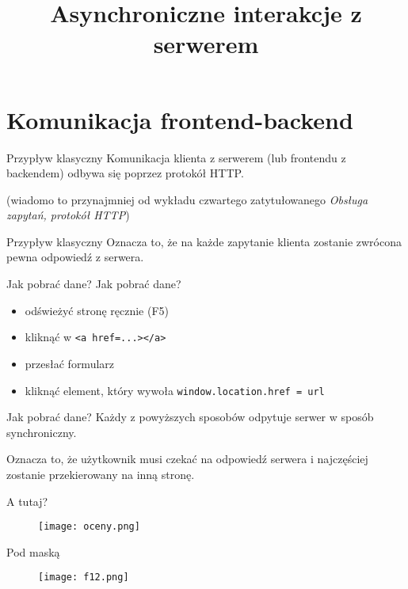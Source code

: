 

\title{Asynchroniczne interakcje z serwerem}



\section{Komunikacja frontend-backend}

\begin{frame}{Przypływ klasyczny}
	Komunikacja klienta z serwerem (lub frontendu z backendem) odbywa się poprzez protokół HTTP.
	
	\small (wiadomo to przynajmniej od wykładu czwartego zatytułowanego \emph{Obsługa zapytań, protokół HTTP})
\end{frame}

\begin{frame}{Przypływ klasyczny}
	Oznacza to, że na każde zapytanie klienta zostanie zwrócona pewna odpowiedź z serwera.
\end{frame}

\begin{frame}{Jak pobrać dane?}
	Jak pobrać dane?
	\begin{itemize}
	\item odświeżyć stronę ręcznie (F5)
	\item kliknąć w \texttt{<a href=...></a>}
	\item przesłać formularz
	\item kliknąć element, który wywoła \texttt{window.location.href = url}
	\end{itemize}
\end{frame}

\begin{frame}{Jak pobrać dane?}
	Każdy z powyższych sposobów odpytuje serwer w sposób synchroniczny. 
	
	Oznacza to, że użytkownik musi czekać na odpowiedź serwera i najczęściej zostanie przekierowany na inną stronę.
\end{frame}

\begin{frame}{A tutaj?}
	\begin{figure}[t]
		\centering
		\texttt{[image: oceny.png]}
	\end{figure}
\end{frame}

\begin{frame}{Pod maską}
	\begin{figure}[t]
		\centering
		\texttt{[image: f12.png]}
	\end{figure}
\end{frame}

